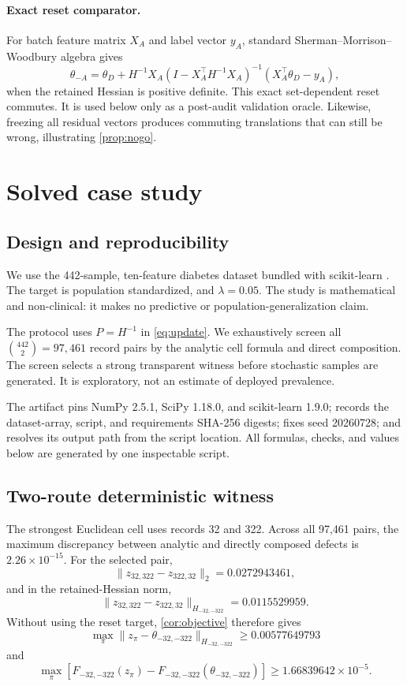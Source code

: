 \documentclass[10pt]{article}
\theoremstyle{definition}
\theoremstyle{remark}
\begin{document}
\paragraph{Exact reset comparator.}
For batch feature matrix \(X_A\) and label vector \(y_A\), standard
Sherman--Morrison--Woodbury algebra \citep{golub2013} gives
\[
\theta_{-A}
=
\theta_D
+
H^{-1}X_A
\left(I-X_A^\top H^{-1}X_A\right)^{-1}
\left(X_A^\top\theta_D-y_A\right),
\tag{7.9}
\]
when the retained Hessian is positive definite. This exact set-dependent
reset commutes. It is used below only as a post-audit validation oracle.
Likewise, freezing all residual vectors produces commuting translations that
can still be wrong, illustrating \cref{prop:nogo}.

\section{Solved case study}

\subsection{Design and reproducibility}

We use the 442-sample, ten-feature diabetes dataset bundled with scikit-learn
\citep{pedregosa2011}. The target is population standardized, and
\(\lambda=0.05\). The study is mathematical and non-clinical: it makes no
predictive or population-generalization claim.

The protocol uses \(P=H^{-1}\) in \eqref{eq:update}. We exhaustively screen all
\(\binom{442}{2}=97{,}461\) record pairs by the analytic cell formula and
direct composition. The screen selects a strong transparent witness before
stochastic samples are generated. It is exploratory, not an estimate of
deployed prevalence.

The artifact pins NumPy 2.5.1, SciPy 1.18.0, and scikit-learn 1.9.0; records
the dataset-array, script, and requirements SHA-256 digests; fixes seed
20260728; and resolves its output path from the script location. All formulas,
checks, and values below are generated by one inspectable script.

\subsection{Two-route deterministic witness}

The strongest Euclidean cell uses records 32 and 322. Across all 97,461
pairs, the maximum discrepancy between analytic and directly composed defects
is \(2.26\times10^{-15}\). For the selected pair,
\[
\|z_{32,322}-z_{322,32}\|_2=0.0272943461,
\]
and in the retained-Hessian norm,
\[
\|z_{32,322}-z_{322,32}\|_{H_{-32,-322}}
=0.0115529959.
\]
Without using the reset target, \cref{cor:objective} therefore gives
\[
\max_\pi
\|z_\pi-\theta_{-32,-322}\|_{H_{-32,-322}}
\ge 0.00577649793
\tag{8.1}
\]
and
\[
\max_\pi
\left[
F_{-32,-322}(z_\pi)-F_{-32,-322}(\theta_{-32,-322})
\right]
\ge 1.66839642\times10^{-5}.
\tag{8.2}
\]
\end{document}
